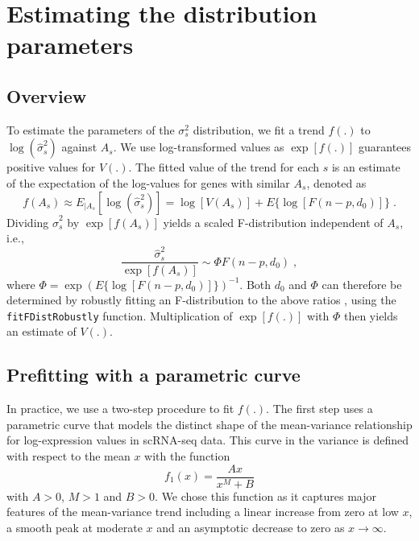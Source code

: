 \documentclass{article}
\begin{document}
\section{Estimating the distribution parameters}

\subsection{Overview}
To estimate the parameters of the $\sigma^2_s$ distribution, we fit a trend $f(.)$ to $\log(\hat\sigma^2_s)$ against $A_s$.
We use log-transformed values as $\exp[f(.)]$ guarantees positive values for $V(.)$.
The fitted value of the trend for each $s$ is an estimate of the expectation of the log-values for genes with similar $A_s$, denoted as
\[
    f(A_s) \approx E_{|A_s}[\log(\hat\sigma^2_s)] = \log[V(A_s)] + E\{\log[F(n-p, d_0)]\} \;.
\]
Dividing $\hat\sigma^2_s$ by $\exp[f(A_s)]$ yields a scaled F-distribution independent of $A_s$, i.e.,
\[
    \frac{\hat\sigma^2_s}{\exp[f(A_s)]} \sim \Phi F(n-p, d_0) \;,
\]
where $\Phi = \exp(E\{\log[F(n-p, d_0)]\})^{-1}$. 
Both $d_0$ and $\Phi$ can therefore be determined by robustly fitting an F-distribution to the above ratios \citep{phipson2016robust}, using the \texttt{fitFDistRobustly} function.
Multiplication of $\exp[f(.)]$ with $\Phi$ then yields an estimate of $V(.)$.

\subsection{Prefitting with a parametric curve}
In practice, we use a two-step procedure to fit $f(.)$.
The first step uses a parametric curve that models the distinct shape of the mean-variance relationship for log-expression values in scRNA-seq data.
This curve in the variance is defined with respect to the mean $x$ with the function
\begin{equation}
    f_1(x) = \frac{A x}{x^M + B} \label{eqn:paramtrend}
\end{equation}
with $A > 0$, $M > 1$ and $B > 0$.
We chose this function as it captures major features of the mean-variance trend including a linear increase from zero at low $x$, a smooth peak at moderate $x$ and an asymptotic decrease to zero as $x \to \infty$.
\end{document}
